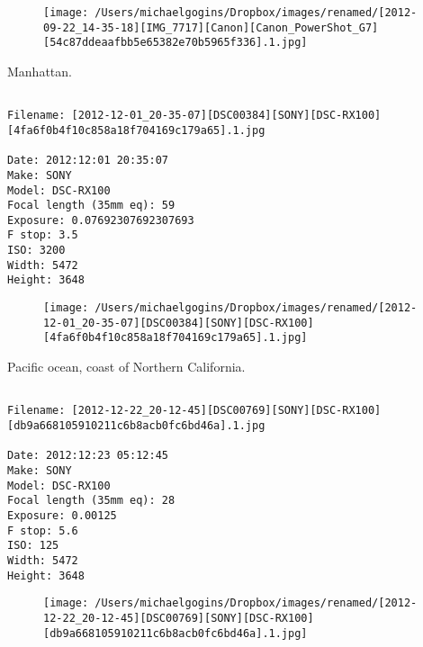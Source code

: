 \begin{figure}
\texttt{[image: /Users/michaelgogins/Dropbox/images/renamed/[2012-09-22\_14-35-18][IMG\_7717][Canon][Canon\_PowerShot\_G7][54c87ddeaafbb5e65382e70b5965f336].1.jpg]}
\end{figure}
    
\clearpage
\onecolumn
\noindent Manhattan.
\noindent
\begin{lstlisting}

Filename: [2012-12-01_20-35-07][DSC00384][SONY][DSC-RX100][4fa6f0b4f10c858a18f704169c179a65].1.jpg

Date: 2012:12:01 20:35:07
Make: SONY
Model: DSC-RX100
Focal length (35mm eq): 59
Exposure: 0.07692307692307693
F stop: 3.5
ISO: 3200
Width: 5472
Height: 3648
\end{lstlisting}
\clearpage

\begin{figure}
\texttt{[image: /Users/michaelgogins/Dropbox/images/renamed/[2012-12-01\_20-35-07][DSC00384][SONY][DSC-RX100][4fa6f0b4f10c858a18f704169c179a65].1.jpg]}
\end{figure}
    
\clearpage
\onecolumn
\noindent Pacific ocean, coast of Northern California.
\noindent
\begin{lstlisting}

Filename: [2012-12-22_20-12-45][DSC00769][SONY][DSC-RX100][db9a668105910211c6b8acb0fc6bd46a].1.jpg

Date: 2012:12:23 05:12:45
Make: SONY
Model: DSC-RX100
Focal length (35mm eq): 28
Exposure: 0.00125
F stop: 5.6
ISO: 125
Width: 5472
Height: 3648
\end{lstlisting}
\clearpage

\begin{figure}
\texttt{[image: /Users/michaelgogins/Dropbox/images/renamed/[2012-12-22\_20-12-45][DSC00769][SONY][DSC-RX100][db9a668105910211c6b8acb0fc6bd46a].1.jpg]}
\end{figure}
    
